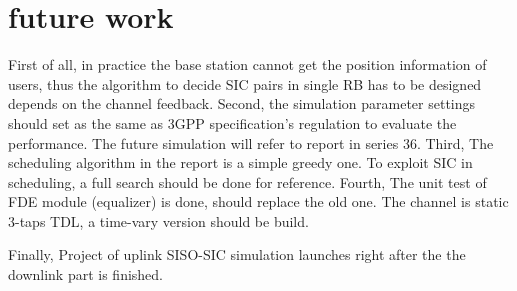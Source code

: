 \section{future work}
\label{future_work}
First of all,
in practice the base station cannot get the position information of users,
thus the algorithm to decide SIC pairs in single RB has to be designed 
depends on the channel feedback.
Second, the simulation parameter settings should set as the same as 3GPP
specification's regulation to evaluate the performance.
The future simulation will refer to report in series 36.
Third,
The scheduling algorithm in the report is a simple greedy one.
To exploit SIC in scheduling, a full search should be done for reference.
Fourth,
The unit test of FDE module (equalizer) is done, should replace the old
one.
The channel is static 3-taps TDL, a time-vary version should be build.

Finally,
Project of uplink SISO-SIC simulation launches right after the the downlink
part is finished.
